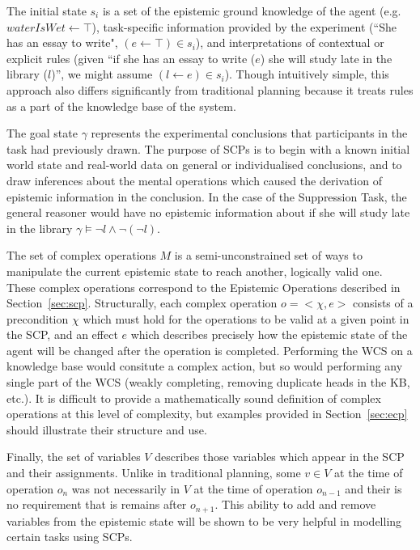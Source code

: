\documentclass{article}
\begin{document}
The initial state $s_i$ is a set of the epistemic ground knowledge of the agent (e.g. $waterIsWet \leftarrow \top$), task-specific information provided by the experiment (``She has an essay to write", $(e \leftarrow \top) \in s_i$), and interpretations of contextual or explicit rules (given ``if she has an essay to write ($e$) she will study late in the library ($l$)'', we might assume $(l\leftarrow e) \in s_i$). Though intuitively simple, this approach also differs significantly from traditional planning because it treats rules as a part of the knowledge base of the system.

The goal state $\gamma$ represents the experimental conclusions that participants in the task had previously drawn. The purpose of SCPs is to begin with a known initial world state and real-world data on general or individualised conclusions, and to draw inferences about the mental operations which caused the derivation of epistemic information in the conclusion. In the case of the Suppression Task, the general reasoner would have no epistemic information about if she will study late in the library $\gamma \models \lnot l \land \lnot (\lnot l)$.

The set of complex operations $M$ is a semi-unconstrained set of ways to manipulate the current epistemic state to reach another, logically valid one. These complex operations correspond to the Epistemic Operations described in Section~\ref{sec:scp}. Structurally, each complex operation $o=<\chi, e>$ consists of a precondition $\chi$ which must hold for the operations to be valid at a given point in the SCP, and an effect $e$ which describes precisely how the epistemic state of the agent will be changed after the operation is completed. Performing the WCS on a knowledge base would consitute a complex action, but so would performing any single part of the WCS (weakly completing, removing duplicate heads in the KB, etc.). It is difficult to provide a mathematically sound definition of complex operations at this level of complexity, but examples provided in Section~\ref{sec:ecp} should illustrate their structure and use.

Finally, the set of variables $V$ describes those variables which appear in the SCP and their assignments. Unlike in traditional planning, some $v \in V$ at the time of operation $o_n$ was not necessarily in $V$ at the time of operation $o_{n-1}$ and their is no requirement that is remains after $o_{n+1}$. This ability to add and remove variables from the epistemic state will be shown to be very helpful in modelling certain tasks using SCPs.
\end{document}
